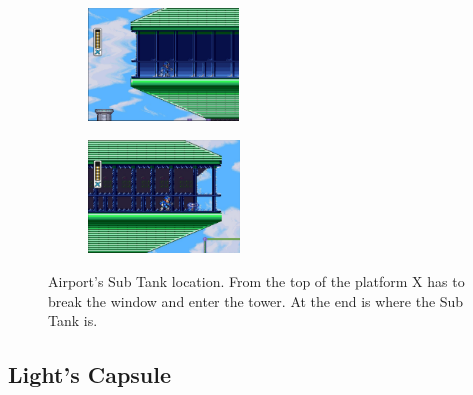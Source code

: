 \begin{figure}[htp]
	\centering
	\begin{subfigure}{0.4\linewidth}
		\centering
		\includegraphics[height=3cm]{figures/X1/Storm_eagle/Storm_tank_1.jpg}
		\caption{}
	\end{subfigure}
	\begin{subfigure}{0.4\linewidth}
		\centering
		\includegraphics[height=3cm]{figures/X1/Storm_eagle/Storm_tank_2.jpg}
		\caption{}
	\end{subfigure}
	\caption{Airport's Sub Tank location. From the top of the platform X has to break the window and enter the tower. At the end is where the Sub Tank is.}
\end{figure}

\subsection{Light's Capsule} 

